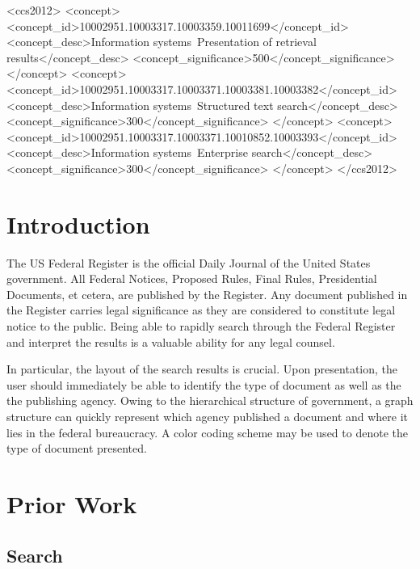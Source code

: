 \documentclass{sig-alternate-05-2015}
\begin{document}
\begin{CCSXML}
<ccs2012>
<concept>
<concept_id>10002951.10003317.10003359.10011699</concept_id>
<concept_desc>Information systems~Presentation of retrieval results</concept_desc>
<concept_significance>500</concept_significance>
</concept>
<concept>
<concept_id>10002951.10003317.10003371.10003381.10003382</concept_id>
<concept_desc>Information systems~Structured text search</concept_desc>
<concept_significance>300</concept_significance>
</concept>
<concept>
<concept_id>10002951.10003317.10003371.10010852.10003393</concept_id>
<concept_desc>Information systems~Enterprise search</concept_desc>
<concept_significance>300</concept_significance>
</concept>
</ccs2012>
\end{CCSXML}

\printccsdesc



\section{Introduction}
The US Federal Register is the official Daily Journal of the United States government. All Federal Notices, Proposed Rules, Final Rules, Presidential Documents, et cetera, are published by the Register. Any document published in the Register carries legal significance as they are considered to constitute legal notice to the public. Being able to rapidly search through the Federal Register and interpret the results is a valuable ability for any legal counsel. 

In particular, the layout of the search results is crucial. Upon presentation, the user should immediately be able to identify the type of document as well as the the publishing agency. Owing to the hierarchical structure of government, a graph structure can quickly represent which agency published a document and where it lies in the federal bureaucracy. A color coding scheme may be used to denote the type of document presented.

\section{Prior Work}
\subsection{Search}
\end{document}
